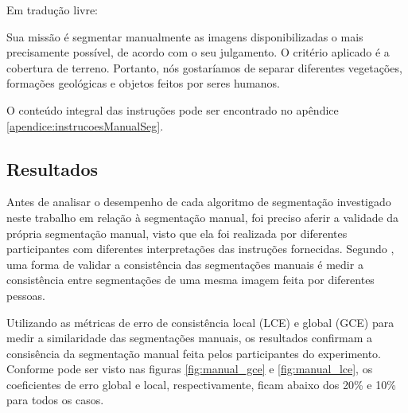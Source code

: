 Em tradução livre:

\begin{citacao}
Sua missão é segmentar manualmente as imagens disponibilizadas o mais precisamente possível, de acordo com o seu julgamento. O critério aplicado é a cobertura de terreno. Portanto, nós gostaríamos de separar diferentes vegetações, formações geológicas e objetos feitos por seres humanos. \cite{amazonsegmentation}
\end{citacao}

O conteúdo integral das instruções pode ser encontrado no apêndice \ref{apendice:instrucoesManualSeg}.

\subsection{Resultados}

Antes de analisar o desempenho de cada algoritmo de segmentação investigado neste trabalho em relação à segmentação manual, foi preciso aferir a validade da própria segmentação manual, visto que ela foi realizada por diferentes participantes com diferentes interpretações das instruções fornecidas. Segundo , uma forma de validar a consistência das segmentações manuais é medir a consistência entre segmentações de uma mesma imagem feita por diferentes pessoas.

Utilizando as métricas de erro de consistência local (LCE) e global (GCE) para medir a similaridade das segmentações manuais, os resultados confirmam a consisência da segmentação manual feita pelos participantes do experimento. Conforme pode ser visto nas figuras \ref{fig:manual_gce} e \ref{fig:manual_lce}, os coeficientes de erro global e local, respectivamente, ficam abaixo dos 20\% e 10\% para todos os casos.

